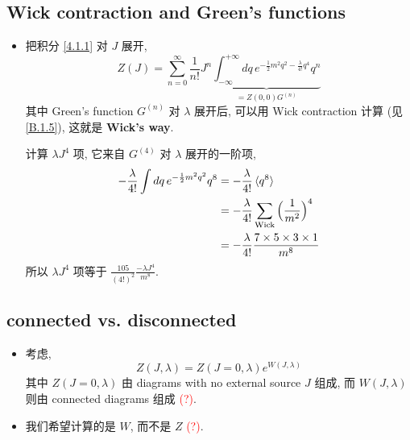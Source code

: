 \subsection{Wick contraction and Green's functions}
\begin{itemize}
	\item 把积分 \eqref{4.1.1} 对 $J$ 展开,
	\begin{equation}
		Z(J) = \sum_{n = 0}^\infty \frac{1}{n!} J^n \underbrace{\int_{- \infty}^{+ \infty} dq \, e^{- \frac{1}{2} m^2 q^2 - \frac{\lambda}{4!} q^4} q^n}_{= Z(0, 0) G^{(n)}}
	\end{equation}
	其中 Green's function $G^{(n)}$ 对 $\lambda$ 展开后, 可以用 Wick contraction 计算 (见 \eqref{B.1.5}), 这就是 \textbf{Wick's way}.
	
	\begin{tcolorbox}[title=calculation:]
		计算 $\lambda J^4$ 项, 它来自 $G^{(4)}$ 对 $\lambda$ 展开的一阶项,
		\begin{align}
			- \frac{\lambda}{4!} \int dq \, e^{- \frac{1}{2} m^2 q^2} q^8 &= - \frac{\lambda}{4!} \braket{q^8} \notag \\
			&= - \frac{\lambda}{4!} \sum_{\text{Wick}} \Big( \frac{1}{m^2} \Big)^4 \notag \\
			&= - \frac{\lambda}{4!} \frac{7 \times 5 \times 3 \times 1}{m^8} \label{4.1.5}
		\end{align}
		所以 $\lambda J^4$ 项等于 $\frac{105}{(4!)^2} \frac{- \lambda J^4}{m^8}$.
	\end{tcolorbox}
\end{itemize}

\subsection{connected vs. disconnected}
\begin{itemize}
	\item 考虑,
	\begin{equation}
		Z(J, \lambda) = Z(J = 0, \lambda) e^{W(J, \lambda)}
	\end{equation}
	其中 $Z(J = 0, \lambda)$ 由 diagrams with no external source $J$ 组成, 而 $W(J, \lambda)$ 则由 connected diagrams 组成 \textcolor{red}{(?)}.
	
	\item 我们希望计算的是 $W$, 而不是 $Z$ \textcolor{red}{(?)}.
\end{itemize}

